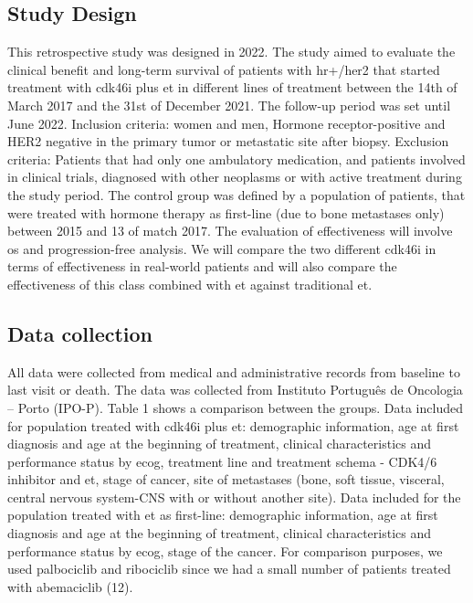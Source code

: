 

\subsection{Study Design}

This retrospective study was designed in 2022. The study aimed to evaluate the clinical benefit and long-term survival of patients with \ac{hr+}/\ac{her2} that started treatment with \ac{cdk46i} plus \ac{et} in different lines of treatment between the 14th of March 2017 and the 31st of December 2021. The follow-up period was set until June 2022. Inclusion criteria: women and men, Hormone receptor-positive and HER2 negative in the primary tumor or metastatic site after biopsy. Exclusion criteria: Patients that had only one ambulatory medication, and patients involved in clinical trials, diagnosed with other neoplasms or with active treatment during the study period. The control group was defined by a population of patients, that were treated with hormone therapy as first-line (due to bone metastases only) between 2015 and 13 of match 2017.
The evaluation of effectiveness will involve \ac{os} and progression-free analysis. We will compare the two different \ac{cdk46i} in terms of effectiveness in real-world patients and will also compare the effectiveness of this class combined with \ac{et} against traditional \ac{et}.


\subsection{Data collection}
All data were collected from medical and administrative records from baseline to last visit or death. The data was collected from Instituto Português de Oncologia – Porto (IPO-P). Table 1 shows a comparison between the groups.
Data included for population treated with \ac{cdk46i} plus \ac{et}: demographic information, age at first diagnosis and age at the beginning of treatment, clinical characteristics and performance status by  \ac{ecog}, treatment line and treatment schema - CDK4/6 inhibitor and \ac{et}, stage of cancer, site of metastases (bone, soft tissue, visceral, central nervous system-CNS with or without another site).
Data included for the population treated with \ac{et} as first-line: demographic information, age at first diagnosis and age at the beginning of treatment, clinical characteristics and performance status by  \ac{ecog}, stage of the cancer.
For comparison purposes, we used palbociclib and ribociclib since we had a small number of patients treated with abemaciclib (12).

